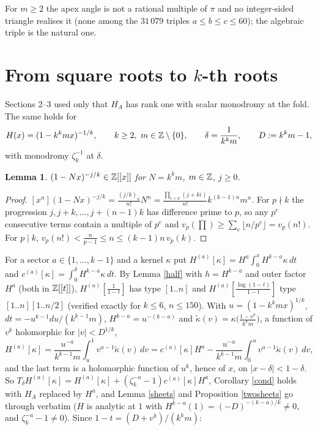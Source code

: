 \documentclass[11pt]{amsart}
\newtheorem{lemma}[theorem]{Lemma}
\theoremstyle{remark}
\newcommand{\lcm}[1]{[1..#1]}
\begin{document}
For $m\ge2$ the apex angle is not a rational multiple of $\pi$ and no integer-sided triangle realises it (none among the $31\,079$ triples $a\le b\le c\le60$); the algebraic triple is the natural one.

\section{From square roots to $k$-th roots}
Sections 2--3 used only that $H_A$ has rank one with scalar monodromy at the fold. The same holds for
\[
H(x)=(1-k^kmx)^{-1/k},\qquad k\ge2,\ m\in\Z\setminus\{0\},\qquad\delta=\frac1{k^km},\qquad D:=k^km-1,
\]
with monodromy $\zeta_k^{-1}$ at $\delta$.

\begin{lemma}\label{intk}
$(1-Nx)^{-j/k}\in\mathbb Z[[x]]$ for $N=k^km$, $m\in\mathbb Z$, $j\ge0$.
\end{lemma}
\begin{proof}
$[x^n](1-Nx)^{-j/k}=\frac{(j/k)_n}{n!}N^n=\frac{\prod_{i<n}(j+ki)}{n!}k^{(k-1)n}m^n$. For $p\nmid k$ the progression $j,j+k,\dots,j+(n-1)k$ has difference prime to $p$, so any $p^e$ consecutive terms contain a multiple of $p^e$ and $v_p(\prod)\ge\sum_e\lfloor n/p^e\rfloor=v_p(n!)$. For $p\mid k$, $v_p(n!)<\frac n{p-1}\le n\le(k-1)n\,v_p(k)$.
\end{proof}

For a sector $a\in\{1,\dots,k-1\}$ and a kernel $\kappa$ put $H^{(a)}[\kappa]=H^a\int_0^xH^{k-a}\kappa\,dt$ and $c^{(a)}[\kappa]=\int_0^\delta H^{k-a}\kappa\,dt$. By Lemma \ref{half} with $h=H^{k-a}$ and outer factor $H^a$ (both in $\mathbb Z[[t]]$), $H^{(a)}[\frac1{1-t}]$ has type $\lcm n$ and $H^{(a)}[\frac{\log(1-t)}{1-t}]$ type $\lcm n\lcm{n/2}$ (verified exactly for $k\le6$, $n\le150$). With $u=(1-k^kmx)^{1/k}$, $dt=-u^{k-1}du/(k^{k-1}m)$, $H^{k-a}=u^{-(k-a)}$ and $\tilde\kappa(v)=\kappa\bigl(\frac{1-v^k}{k^km}\bigr)$, a function of $v^k$ holomorphic for $|v|<D^{1/k}$,
\[
H^{(a)}[\kappa]=\frac{u^{-a}}{k^{k-1}m}\int_u^1v^{a-1}\tilde\kappa(v)\,dv=c^{(a)}[\kappa]H^a-\frac{u^{-a}}{k^{k-1}m}\int_0^uv^{a-1}\tilde\kappa(v)\,dv,
\]
and the last term is a holomorphic function of $u^k$, hence of $x$, on $|x-\delta|<1-\delta$. So $T_\delta H^{(a)}[\kappa]=H^{(a)}[\kappa]+(\zeta_k^{-a}-1)c^{(a)}[\kappa]H^a$, Corollary \ref{cond} holds with $H_A$ replaced by $H^a$, and Lemma \ref{sheets} and Proposition \ref{twosheets} go through verbatim ($H$ is analytic at $1$ with $H^{k-a}(1)=(-D)^{-(k-a)/k}\ne0$, and $\zeta_k^{-a}-1\ne0$). Since $1-t=(D+v^k)/(k^km)$:
\end{document}
